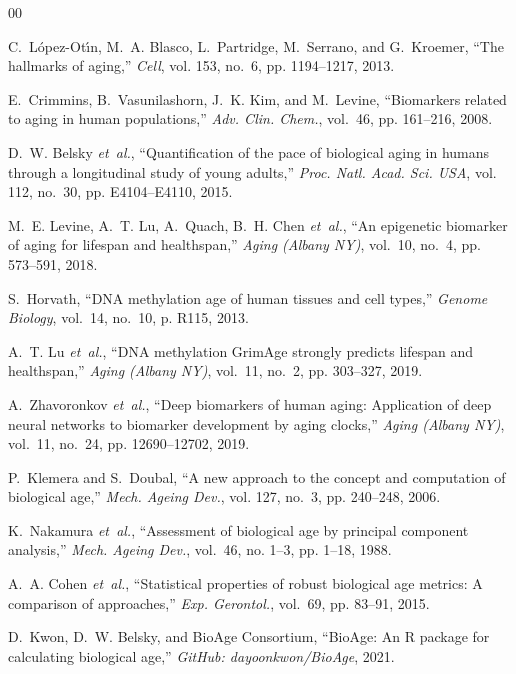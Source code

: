 \documentclass[conference]{IEEEtran}
\begin{document}

\begin{thebibliography}{00}

C.~L{\'o}pez-Ot{\'\i}n, M.~A. Blasco, L.~Partridge, M.~Serrano, and G.~Kroemer, ``The hallmarks of aging,'' \emph{Cell}, vol. 153, no.~6, pp. 1194--1217, 2013.

E.~Crimmins, B.~Vasunilashorn, J.~K. Kim, and M.~Levine, ``Biomarkers related to aging in human populations,'' \emph{Adv. Clin. Chem.}, vol.~46, pp. 161--216, 2008.

D.~W. Belsky \emph{et~al.}, ``Quantification of the pace of biological aging in humans through a longitudinal study of young adults,'' \emph{Proc. Natl. Acad. Sci. USA}, vol. 112, no.~30, pp. E4104--E4110, 2015.

M.~E. Levine, A.~T. Lu, A.~Quach, B.~H. Chen \emph{et~al.}, ``An epigenetic biomarker of aging for lifespan and healthspan,'' \emph{Aging (Albany NY)}, vol.~10, no.~4, pp. 573--591, 2018.

S.~Horvath, ``DNA methylation age of human tissues and cell types,'' \emph{Genome Biology}, vol.~14, no.~10, p. R115, 2013.

A.~T. Lu \emph{et~al.}, ``DNA methylation GrimAge strongly predicts lifespan and healthspan,'' \emph{Aging (Albany NY)}, vol.~11, no.~2, pp. 303--327, 2019.

A.~Zhavoronkov \emph{et~al.}, ``Deep biomarkers of human aging: Application of deep neural networks to biomarker development by aging clocks,'' \emph{Aging (Albany NY)}, vol.~11, no.~24, pp. 12690--12702, 2019.

P.~Klemera and S.~Doubal, ``A new approach to the concept and computation of biological age,'' \emph{Mech. Ageing Dev.}, vol. 127, no.~3, pp. 240--248, 2006.

K.~Nakamura \emph{et~al.}, ``Assessment of biological age by principal component analysis,'' \emph{Mech. Ageing Dev.}, vol.~46, no. 1--3, pp. 1--18, 1988.

A.~A. Cohen \emph{et~al.}, ``Statistical properties of robust biological age metrics: A comparison of approaches,'' \emph{Exp. Gerontol.}, vol.~69, pp. 83--91, 2015.

D.~Kwon, D.~W. Belsky, and BioAge Consortium, ``BioAge: An R package for calculating biological age,'' \emph{GitHub: dayoonkwon/BioAge}, 2021.


\end{thebibliography}
\end{document}
